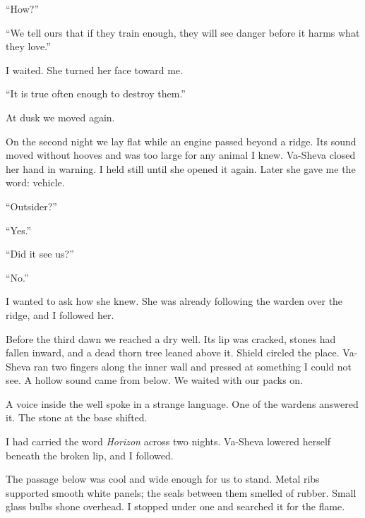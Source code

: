 ``How?''\par

``We tell ours that if they train enough, they will see danger before it harms what they love.''\par

I waited. She turned her face toward me.\par

``It is true often enough to destroy them.''\par

At dusk we moved again.\par

On the second night we lay flat while an engine passed beyond a ridge. Its sound moved without hooves and was too large for any animal I knew. Va-Sheva closed her hand in warning. I held still until she opened it again. Later she gave me the word: vehicle.\par

``Outsider?''\par

``Yes.''\par

``Did it see us?''\par

``No.''\par

I wanted to ask how she knew. She was already following the warden over the ridge, and I followed her.\par

Before the third dawn we reached a dry well. Its lip was cracked, stones had fallen inward, and a dead thorn tree leaned above it. Shield circled the place. Va-Sheva ran two fingers along the inner wall and pressed at something I could not see. A hollow sound came from below. We waited with our packs on.\par

A voice inside the well spoke in a strange language. One of the wardens answered it. The stone at the base shifted.\par

I had carried the word \textit{Horizon} across two nights. Va-Sheva lowered herself beneath the broken lip, and I followed.\par

The passage below was cool and wide enough for us to stand. Metal ribs supported smooth white panels; the seals between them smelled of rubber. Small glass bulbs shone overhead. I stopped under one and searched it for the flame.\par

